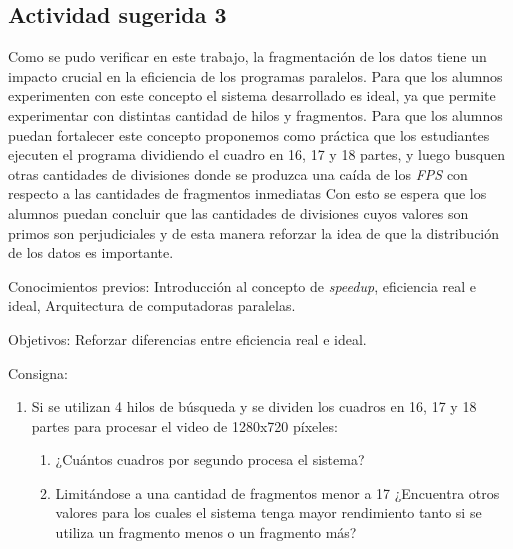 \subsection{Actividad sugerida 3}

Como se pudo verificar en este trabajo, la fragmentación de los datos tiene un
impacto crucial en la eficiencia de los programas paralelos. Para que los
alumnos experimenten con este concepto el sistema desarrollado es ideal, ya que
permite experimentar con distintas cantidad de hilos y fragmentos. Para que los
alumnos puedan fortalecer este concepto proponemos como práctica que los
estudiantes ejecuten el programa dividiendo el cuadro en 16, 17 y 18 partes, y
luego busquen otras cantidades de divisiones donde se produzca una caída de los
\emph{FPS} con respecto a las cantidades de fragmentos inmediatas Con esto se
espera que los alumnos puedan concluir que las cantidades de divisiones cuyos
valores son primos son perjudiciales y de esta manera reforzar la idea de que la
distribución de los datos es importante.

\begin{description}

	\item{Conocimientos previos}: Introducción al concepto de
		\emph{speedup}, eficiencia real e ideal, Arquitectura de
		computadoras paralelas.

	\item{Objetivos}: Reforzar diferencias entre eficiencia real e ideal.

	\item{Consigna}: \begin{enumerate}

	\item{Si se utilizan 4 hilos de búsqueda y se dividen los cuadros en 16,
		17 y 18 partes para procesar el video de 1280x720 píxeles:

\begin{enumerate}

	\item{¿Cuántos cuadros por segundo procesa el sistema?}

	\item{Limitándose a una cantidad de fragmentos menor a 17 ¿Encuentra
		otros valores para los cuales el sistema tenga mayor rendimiento
		tanto si se utiliza un fragmento menos o un fragmento más?}

\end{enumerate}}

\end{enumerate}

\end{description}

